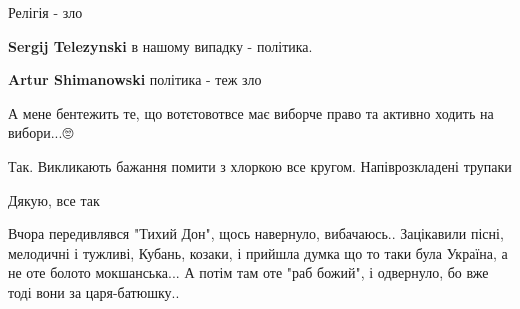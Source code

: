 \begin{itemize}
Релігія - зло

\begin{itemize}
 
\textbf{Sergij Telezynski} в нашому випадку - політика.

 
\textbf{Artur Shimanowski} політика - теж зло
\end{itemize}

 
А мене бентежить те, що вотєтовотвсе має виборче право та активно ходить на вибори...🙄

 
Так. Викликають бажання помити з хлоркою все кругом. Напіврозкладені трупаки

 
Дякую, все так

 

Вчора передивлявся "Тихий Дон", щось навернуло, вибачаюсь.. Зацікавили пісні,
мелодичні і тужливі, Кубань, козаки, і прийшла думка що то таки була Україна, а
не оте болото мокшанська... А потім там оте "раб божий", і одвернуло, бо вже
тоді вони за царя-батюшку..


\end{itemize}
